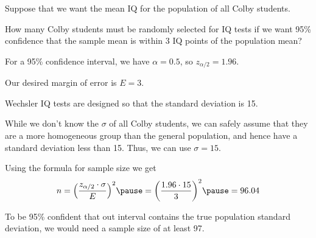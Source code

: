 \documentclass{beamer}
\begin{document}
\begin{frame}
\begin{example}
Suppose that we want the mean IQ for the population of all Colby students. \pause

\vspace{1mm}
How many Colby students must be randomly selected for IQ tests if we want 95\% confidence that the sample mean is within 3 IQ points of the population mean?\pause

\vspace{1mm}
For a 95\% confidence interval, we have $\alpha=0.5$, so $z_{\alpha/2}=1.96$. \pause

\vspace{1mm}
Our desired margin of error is $E=3$.\pause

\vspace{1mm}
Wechsler IQ tests are designed so that the standard deviation is 15.\pause

\vspace{1mm} 
While we don't know the $\sigma$ of all Colby students, we can safely assume that they are a more homogeneous group than the general population, and hence have a standard deviation less than 15. Thus, we can use $\sigma=15$.\pause

Using the formula for sample size we get
\vspace{-1mm}
\begin{equation*}
n={\left(\dfrac{z_{\alpha/2}\cdot\sigma}{E}\right)}^2\pause
={\left(\dfrac{1.96\cdot 15}{3}\right)}^2\pause
= 96.04
\end{equation*}\pause

\vspace{-4mm}
To be 95\% confident that out interval contains the true population standard deviation, we would need a sample size of at least 97.
\end{example}
\end{frame}
\end{document}
